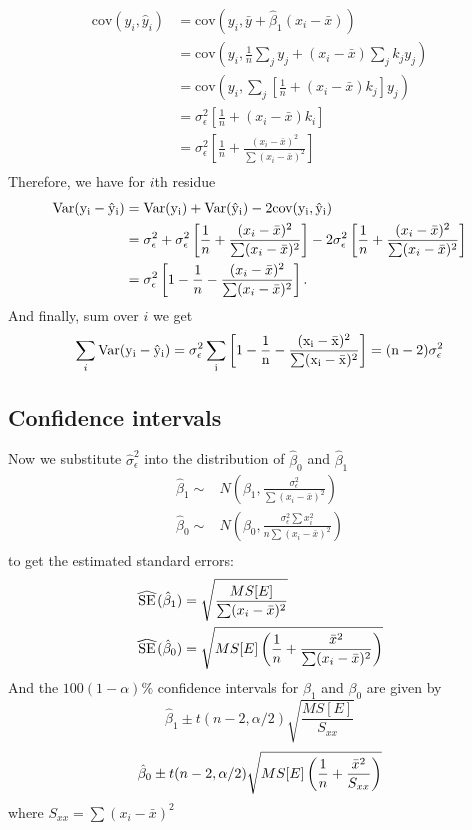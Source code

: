 \begin{pf}
$$
\begin{aligned}
\mbox{cov}(y_i, \hat{y}_i) &= \mbox{cov}(y_i, \bar{y} + \hat{\beta}_1 (x_i - \bar{x}))\\
&= \mbox{cov}(y_i, \frac{1}{n}\sum_j {y_j} + (x_i - \bar{x}) \sum_j k_j y_j)\\
&= \mbox{cov}(y_i, \sum_j \left[ \frac{1}{n} + (x_i - \bar{x}) k_j \right] y_j)\\
&= \sigma^2_\epsilon \left[ \frac{1}{n} + (x_i - \bar{x}) k_i \right]\\
&=\sigma^2_\epsilon \left[ \frac{1}{n} + \frac{ (x_i - \bar{x})^2 }{\sum(x_i - \bar{x})^2}\right]\\
\end{aligned}
$$
%
Therefore, we have for $i$th residue
$$
\begin{aligned}
\rm Var(y_i - \hat{y}_i) &= \rm Var(y_i) + \rm Var(\hat{y}_i) - 2\mbox{cov}(y_i, \hat{y}_i)\\
&= \sigma_\epsilon^2 + \sigma^2_\epsilon \left[ \frac{1}{n} + \frac{ (x_i - \bar{x})^2 }{\sum(x_i - \bar{x})^2} \right] - 2 \sigma^2_\epsilon \left[ \frac{1}{n} +  \frac{ (x_i - \bar{x})^2 }{\sum(x_i - \bar{x})^2} \right] \\
&= \sigma_\epsilon^2 \left[ 1 - \frac{1}{n} -  \frac{ (x_i - \bar{x})^2 }{\sum(x_i - \bar{x})^2} \right].
\end{aligned}
$$
%
And finally, sum over $i$ we get
$$
\sum_i \rm Var(y_i - \hat{y}_i) = \sigma_\epsilon^2 \sum_i  \left[ 1 - \frac{1}{n} -  \frac{ (x_i - \bar{x})^2 }{\sum(x_i - \bar{x})^2} \right] = (n - 2)\sigma_\epsilon^2
$$
\end{pf}

\subsection*{Confidence intervals}
Now we substitute $\hat{\sigma}_\epsilon^2$ into the distribution of $\hat{\beta}_0$ and $\hat{\beta}_1$
  $$
  \begin{aligned}
    \hat{\beta}_1 \sim & N(\beta_1, \frac{\sigma^2_\epsilon}{\sum(x_i - \bar{x})^2})\\
    \hat{\beta}_0 \sim& N(\beta_0, \frac{\sigma^2_\epsilon \sum{x_i^2}}{n\sum(x_i - \bar{x})^2}) \\    
  \end{aligned}
  $$
  to get the estimated standard errors:
  $$
  \begin{aligned}
  \reallywidehat{SE}(\hat{\beta}_1) &= \sqrt{\frac{MS[E]}{\sum(x_i - \bar{x})^2}}\\
    \reallywidehat{SE}(\hat{\beta}_0) &= \sqrt{MS[E] \left( \frac{1}{n} + \frac{\bar{x}^2}{\sum(x_i - \bar{x})^2} \right)}\\
  \end{aligned}
  $$
  And the $100(1 - \alpha)\%$ confidence intervals for $\beta_1$ and $\beta_0$ are given by
  $$
  \hat{\beta}_1 \pm t(n - 2, \alpha / 2) \sqrt{\frac{MS[E]}{S_{xx}}}
  $$
  $$
  \hat{\beta}_0 \pm t(n - 2, \alpha / 2) \sqrt{MS[E] \left( \frac{1}{n} + \frac{\bar{x}^2}{S_{xx}} \right)}\\
  $$
  where $S_{xx} = \sum(x_i - \bar{x})^2$

